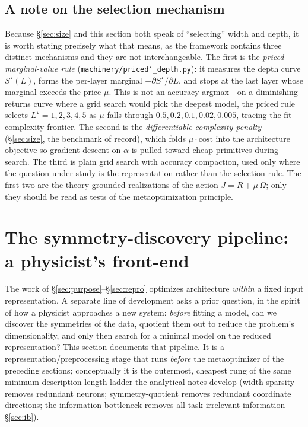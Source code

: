 \documentclass[11pt]{article}
\newcommand{\allowbreakhere}{\discretionary{}{}{}}
\newcommand{\code}[1]{\texttt{\def\_{\char`_\allowbreakhere}#1}}
\begin{document}
\subsection{A note on the selection mechanism}
\label{sec:selectionnote}

Because \S\ref{sec:size} and this section both speak of ``selecting'' width and depth, it is worth
stating precisely what that means, as the framework contains three distinct mechanisms and they are
not interchangeable. The first is the \emph{priced marginal-value rule}
(\code{machinery/priced\_depth.py}): it measures the depth curve $S^\star(L)$, forms the per-layer
marginal $-\partial S^\star/\partial L$, and stops at the last layer whose marginal exceeds the price
$\mu$. This is not an accuracy argmax---on a diminishing-returns curve where a grid search would pick
the deepest model, the priced rule selects $L^\star=1,2,3,4,5$ as $\mu$ falls through
$0.5,0.2,0.1,0.02,0.005$, tracing the fit--complexity frontier. The second is the
\emph{differentiable complexity penalty} (\S\ref{sec:size}, the benchmark of record), which folds
$\mu\cdot\text{cost}$ into the architecture objective so gradient descent on $\alpha$ is pulled
toward cheap primitives during search. The third is plain grid search with accuracy compaction, used
only where the question under study is the representation rather than the selection rule. The first
two are the theory-grounded realizations of the action $J=R+\mu\,\Omega$; only they should be read as
tests of the metaoptimization principle.



\section{The symmetry-discovery pipeline: a physicist's front-end}
\label{sec:symmetry}

The work of \S\ref{sec:purpose}--\S\ref{sec:repro} optimizes architecture \emph{within} a fixed
input representation. A separate line of development asks a prior question, in the spirit of how a
physicist approaches a new system: \emph{before} fitting a model, can we discover the symmetries of
the data, quotient them out to reduce the problem's dimensionality, and only then search for a
minimal model on the reduced representation? This section documents that pipeline. It is a
representation/preprocessing stage that runs \emph{before} the metaoptimizer of the preceding
sections; conceptually it is the outermost, cheapest rung of the same minimum-description-length
ladder the analytical notes develop (width sparsity removes redundant neurons; symmetry-quotient
removes redundant coordinate directions; the information bottleneck removes all task-irrelevant
information---\S\ref{sec:ib}).
\end{document}
